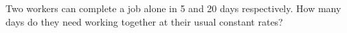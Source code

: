 Two workers can complete a job alone in 5 and 20 days respectively. How many days do they need working together at their usual constant rates?
